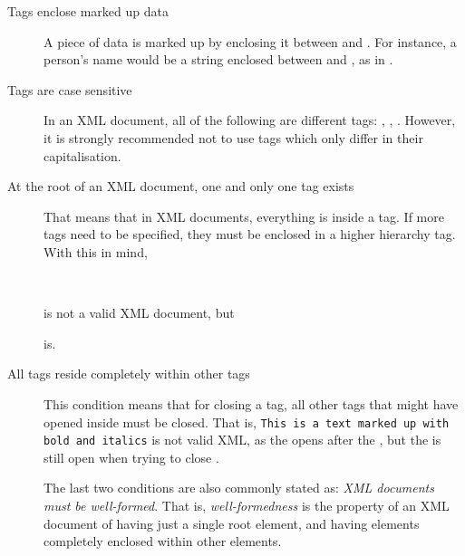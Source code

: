 		\begin{description}
			\item[Tags enclose marked up data] A piece of data is
			marked up by enclosing it between  and
			. For instance, a person's name would be
			a string enclosed between  and
			, as in .
			
			\item[Tags are case sensitive] In an XML document, all
			of the following are different tags: ,
			, . However, it is strongly
			recommended not to use tags which only differ in their
			capitalisation.
			
			\item[At the root of an XML document, one and only one
			tag exists] That means that in XML documents,
			everything is inside a tag. If more tags need to be
			specified, they must be enclosed in a higher hierarchy
			tag. With this in mind,
			
			\\
			
			\noindent is not a valid XML document, but
			
			
			\noindent is.
			
			\item[All tags reside completely within other tags]
			This condition means that for closing a tag, all other
			tags that might have opened inside must be closed. That
			is, \texttt{This is a text
			marked up with bold and italics}
			 is not valid XML, as the
			 opens after the , but the
			 is still open when trying to close
			.
			
			The last two conditions are also commonly stated as:
			\emph{XML documents must be well-formed}. That is,
			\emph{well-formedness} is the property of an XML
			document of having just a single root element, and
			having elements completely enclosed within other
			elements.
		\end{description}
		
